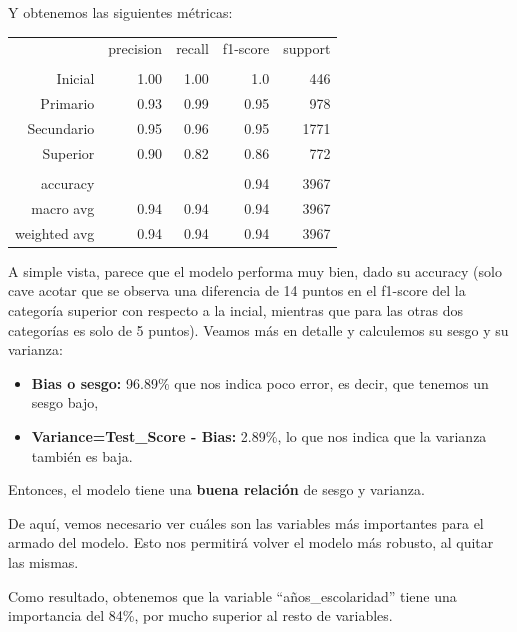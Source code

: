 \documentclass[a4paper]{article}
\begin{document}
            Y obtenemos las siguientes métricas:

            \begin{table}[H]
                \centering
                \begin{tabular}{rrrrr}
                    ~ & precision & recall & f1-score & support \\ 
                    & & & & \\
                    Inicial    & 1.00& 1.00 & 1.0 & 446 \\ 
                    Primario   & 0.93 & 0.99 & 0.95 & 978 \\ 
                    Secundario & 0.95 & 0.96 & 0.95 & 1771 \\ 
                    Superior   & 0.90 & 0.82 & 0.86 & 772 \\ 
                    & & & & \\
                    accuracy & & & 0.94 & 3967 \\ 
                    macro avg & 0.94 & 0.94 & 0.94 & 3967 \\ 
                    weighted avg & 0.94 & 0.94 & 0.94 & 3967 \\ 
                \end{tabular}
            \end{table}

            A simple vista, parece que el modelo performa muy bien, dado su accuracy (solo cave acotar que se observa una diferencia de 14 puntos en el f1-score del la categoría superior con respecto a la incial, mientras que para las otras dos categorías es solo de 5 puntos). Veamos más en detalle y calculemos su sesgo y su varianza:
            \begin{itemize}
                \item \textbf{Bias o sesgo:} 96.89\% que nos indica poco error, es decir, que tenemos un sesgo bajo,
                \item \textbf{Variance=Test\_Score - Bias:} 2.89\%, lo que nos indica que la varianza también es baja.
            \end{itemize}

            Entonces, el modelo tiene una \textbf{buena relación} de sesgo y varianza.

            De aquí, vemos necesario ver cuáles son las variables más importantes para el armado del modelo. Esto nos permitirá volver el modelo más robusto, al quitar las mismas. 

            Como resultado, obtenemos que la variable ``años\_escolaridad'' tiene una importancia del 84\%, por mucho superior al resto de variables.
\end{document}
